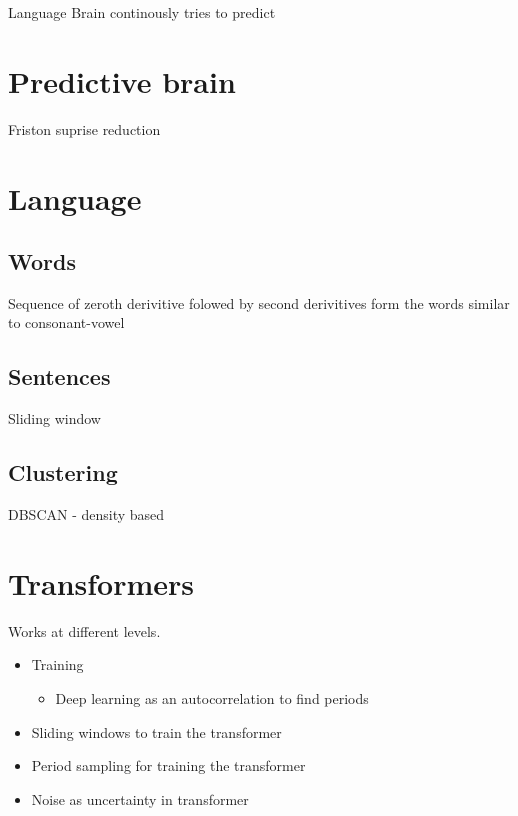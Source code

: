 \begin{frame}{Language}
    Brain continously tries to predict
    
    
    \section{Predictive brain}
        Friston suprise reduction
    
    
    \section{Language}
        
        \subsection{Words}
            Sequence of zeroth derivitive folowed by second derivitives form the words similar to consonant-vowel
        
        \subsection{Sentences}
            Sliding window
        
        \subsection{Clustering}
            DBSCAN - density based
    
    
    \section{Transformers}
        Works at different levels.
        
        \begin{itemize}
            \item Training
            \begin{itemize}
                \item Deep learning as an autocorrelation to find periods
            \end{itemize}
            \item Sliding windows to train the transformer
            \item Period sampling for training the transformer
            \item Noise as uncertainty in transformer
        
        \end{itemize}

\end{frame}